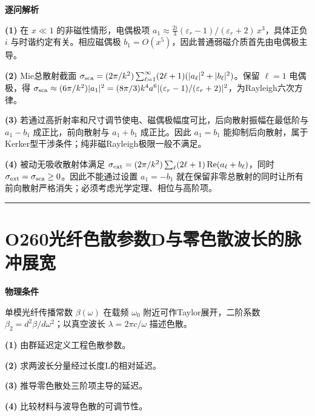 \documentclass[UTF8,a4paper,11pt,oneside,openany]{ctexbook}
\begin{document}
\par\medskip\noindent\textbf{逐问解析}
\par\noindent\textbf{(1)} 在 \(x\ll1\) 的非磁性情形，电偶极项 \(a_1\approx\frac{2i}{3}(\varepsilon_r-1)/(\varepsilon_r+2)\,x^3\)，具体正负 \(i\) 与时谐约定有关。相应磁偶极 \(b_1=O(x^5)\)，因此普通弱磁介质首先由电偶极主导。
\par\noindent\textbf{(2)} Mie总散射截面 \(\sigma_{\rm sca}=(2\pi/k^2)\sum_{\ell=1}^\infty(2\ell+1)(|a_\ell|^2+|b_\ell|^2)\)。保留 \(\ell=1\) 电偶极，得 \(\sigma_{\rm sca}\approx(6\pi/k^2)|a_1|^2=(8\pi/3)k^4a^6|(\varepsilon_r-1)/(\varepsilon_r+2)|^2\)，为Rayleigh六次方律。
\par\noindent\textbf{(3)} 若通过高折射率和尺寸调节使电、磁偶极幅度可比，后向散射振幅在最低阶与 \(a_1-b_1\) 成正比，前向散射与 \(a_1+b_1\) 成正比。因此 \(a_1=b_1\) 能抑制后向散射，属于Kerker型干涉条件；纯非磁Rayleigh极限一般不满足。
\par\noindent\textbf{(4)} 被动无吸收散射体满足 \(\sigma_{\rm ext}=(2\pi/k^2)\sum_\ell(2\ell+1)\operatorname{Re}(a_\ell+b_\ell)\)，同时 \(\sigma_{\rm ext}=\sigma_{\rm sca}\ge0\)。因此不能通过设置 \(a_1=-b_1\) 就在保留非零总散射的同时让所有前向散射严格消失；必须考虑光学定理、相位与高阶项。

\par\bigskip\hrule\bigskip
\section*{O260\quad 光纤色散参数D与零色散波长的脉冲展宽}
\textbf{物理条件}\par 单模光纤传播常数 \(\beta(\omega)\) 在载频 \(\omega_0\) 附近可作Taylor展开，二阶系数 \(\beta_2=d^2\beta/d\omega^2\)；以真空波长 \(\lambda=2\pi c/\omega\) 描述色散。
\par\noindent\textbf{(1)} 由群延迟定义工程色散参数。
\par\noindent\textbf{(2)} 求两波长分量经过长度L的相对延迟。
\par\noindent\textbf{(3)} 推导零色散处三阶项主导的延迟。
\par\noindent\textbf{(4)} 比较材料与波导色散的可调节性。
\end{document}
